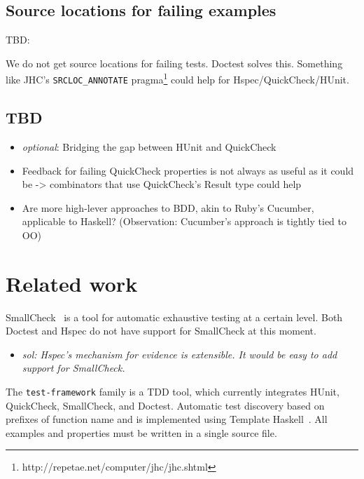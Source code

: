 \documentclass[preprint]{sigplanconf}
\begin{document}
\subsection{Source locations for failing examples}

TBD:

We do not get source locations for failing tests. Doctest solves this.
Something like JHC's
\verb|SRCLOC_ANNOTATE|
pragma\footnote{%
http://repetae.net/computer/jhc/jhc.shtml} could help
for Hspec/QuickCheck/HUnit.

\subsection{TBD}

\begin{itemize}
    \item \emph{optional}: Bridging the gap between HUnit and QuickCheck
    \item
        Feedback for failing QuickCheck properties is not always as
        useful as it could be -> combinators that use QuickCheck's
        Result type could help
    \item
        Are more high-lever approaches to BDD, akin to Ruby's
        Cucumber, applicable to Haskell? (Observation: Cucumber's
        approach is tightly tied to OO)
\end{itemize}

\section{Related work}

SmallCheck~\cite{smallcheck} is a tool for
automatic exhaustive testing at a certain level.
Both Doctest and Hspec do not have support for SmallCheck
at this moment.
\begin{itemize}
    \item
        \emph{sol: Hspec's mechanism for evidence is extensible.  It
        would be easy to add support for SmallCheck.}
\end{itemize}

The {\tt test-framework} family is a TDD tool,
which currently integrates HUnit, QuickCheck, SmallCheck, and Doctest.
Automatic test discovery based on prefixes of function name
and is implemented using Template Haskell~\cite{template-haskell}.
All examples and properties must be written in a single
source file.
\end{document}
